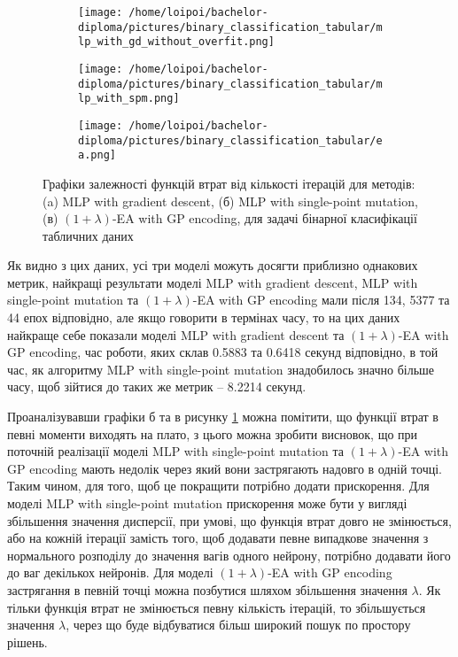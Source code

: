 \begin{figure}[ht]
	\centering
	\begin{subfigure}[b]{0.32\textwidth}    
		\texttt{[image: /home/loipoi/bachelor-diploma/pictures/binary\_classification\_tabular/mlp\_with\_gd\_without\_overfit.png]}
		\caption{}
	\end{subfigure}
	\begin{subfigure}[b]{0.32\textwidth}
		\texttt{[image: /home/loipoi/bachelor-diploma/pictures/binary\_classification\_tabular/mlp\_with\_spm.png]}
		\caption{}
	\end{subfigure}	
	\begin{subfigure}[b]{0.32\textwidth}
		\texttt{[image: /home/loipoi/bachelor-diploma/pictures/binary\_classification\_tabular/ea.png]}
		\caption{}
	\end{subfigure}
	
	\caption{Графіки залежності функцій втрат від кількості ітерацій для методів: (a) MLP with gradient descent, (б) MLP with single-point mutation, (в) $(1+\lambda)$-EA with GP encoding, для задачі бінарної класифікації табличних даних}
	\label{fig_losses_bc_td}
\end{figure}

Як видно з цих даних, усі три моделі можуть досягти приблизно однакових метрик, найкращі результати моделі MLP with gradient descent, MLP with single-point mutation та $(1+\lambda)$-EA with GP encoding мали після 134, 5377 та 44 епох відповідно, але якщо говорити в термінах часу, то на цих даних найкраще себе показали моделі MLP with gradient descent та $(1+\lambda)$-EA with GP encoding, час роботи, яких склав 0.5883 та 0.6418 секунд відповідно, в той час, як алгоритму MLP with single-point mutation знадобилось значно більше часу, щоб зійтися до таких же метрик -- 8.2214 секунд.

Проаналізувавши графіки б та в рисунку \ref{fig_losses_bc_td} можна помітити, що функції втрат в певні моменти виходять на плато, з цього можна зробити висновок, що при поточній реалізації моделі MLP with single-point mutation та $(1+\lambda)$-EA with GP encoding мають недолік через який вони застрягають надовго в одній точці. Таким чином, для того, щоб це покращити потрібно додати прискорення. Для моделі MLP with single-point mutation прискорення може бути у вигляді збільшення значення дисперсії, при умові, що функція втрат довго не змінюється, або на кожній ітерації замість того, щоб додавати певне випадкове значення з нормального розподілу до значення вагів одного нейрону, потрібно додавати його до ваг декількох нейронів. Для моделі $(1+\lambda)$-EA with GP encoding застрягання в певній точці можна позбутися шляхом збільшення значення $\lambda$. Як тільки функція втрат не змінюється певну кількість ітерацій, то збільшується значення $\lambda$, через що буде відбуватися більш широкий пошук по простору рішень.

